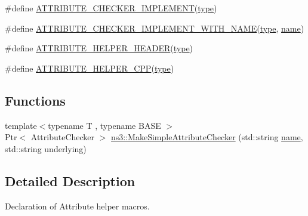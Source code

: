 \begin{DoxyCompactItemize}
\item 
\#define \hyperlink{group__attributehelper_ga87c7604a9f872336f7d46b4a3666862d}{A\+T\+T\+R\+I\+B\+U\+T\+E\+\_\+\+C\+H\+E\+C\+K\+E\+R\+\_\+\+I\+M\+P\+L\+E\+M\+E\+NT}(\hyperlink{visualizer-ideas_8txt_add98db9e15e2a58cf2b57623e7aa893a}{type})
\item 
\#define \hyperlink{group__attributehelper_ga6dc3c2e10ed32b4d6987347567de3f21}{A\+T\+T\+R\+I\+B\+U\+T\+E\+\_\+\+C\+H\+E\+C\+K\+E\+R\+\_\+\+I\+M\+P\+L\+E\+M\+E\+N\+T\+\_\+\+W\+I\+T\+H\+\_\+\+N\+A\+ME}(\hyperlink{visualizer-ideas_8txt_add98db9e15e2a58cf2b57623e7aa893a}{type},  \hyperlink{generate__test__data__lte__spectrum__model_8m_ab74e6bf80237ddc4109968cedc58c151}{name})
\item 
\#define \hyperlink{group__attributehelper_ga55f148f11c61b206b4e846f8e9d14bca}{A\+T\+T\+R\+I\+B\+U\+T\+E\+\_\+\+H\+E\+L\+P\+E\+R\+\_\+\+H\+E\+A\+D\+ER}(\hyperlink{visualizer-ideas_8txt_add98db9e15e2a58cf2b57623e7aa893a}{type})
\item 
\#define \hyperlink{group__attributehelper_ga02f4f05f51c4aa6602f3146357219b9a}{A\+T\+T\+R\+I\+B\+U\+T\+E\+\_\+\+H\+E\+L\+P\+E\+R\+\_\+\+C\+PP}(\hyperlink{visualizer-ideas_8txt_add98db9e15e2a58cf2b57623e7aa893a}{type})
\end{DoxyCompactItemize}
\subsection*{Functions}
\begin{DoxyCompactItemize}
\item 
{\footnotesize template$<$typename T , typename B\+A\+SE $>$ }\\Ptr$<$ Attribute\+Checker $>$ \hyperlink{group__attributeimpl_gabb1f14e9bbd7c4eda14c8a794a9b29ad}{ns3\+::\+Make\+Simple\+Attribute\+Checker} (std\+::string \hyperlink{generate__test__data__lte__spectrum__model_8m_ab74e6bf80237ddc4109968cedc58c151}{name}, std\+::string underlying)
\end{DoxyCompactItemize}


\subsection{Detailed Description}
Declaration of Attribute helper macros. 